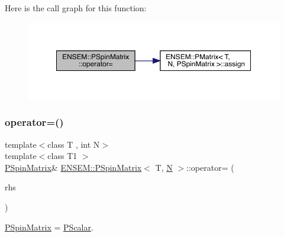 Here is the call graph for this function\+:
\nopagebreak
\begin{figure}[H]
\begin{center}
\leavevmode
\includegraphics[width=350pt]{d0/d1e/classENSEM_1_1PSpinMatrix_a2a776d9189f8d6fa8f9d9bc6758713c9_cgraph}
\end{center}
\end{figure}
\mbox{\label{classENSEM_1_1PSpinMatrix_a0b0ca395b4662cc2f1a18724aa8354e4}} 
\subsubsection{\texorpdfstring{operator=()}{operator=()}\hspace{0.1cm}{\footnotesize\ttfamily [4/9]}}
{\footnotesize\ttfamily template$<$class T , int N$>$ \\
template$<$class T1 $>$ \\
\mbox{\hyperlink{classENSEM_1_1PSpinMatrix}{P\+Spin\+Matrix}}\& \mbox{\hyperlink{classENSEM_1_1PSpinMatrix}{E\+N\+S\+E\+M\+::\+P\+Spin\+Matrix}}$<$ T, \mbox{\hyperlink{adat__devel_2lib_2hadron_2operator__name__util_8cc_a7722c8ecbb62d99aee7ce68b1752f337}{N}} $>$\+::operator= (\begin{DoxyParamCaption}\item[{const \mbox{\hyperlink{classENSEM_1_1PScalar}{P\+Scalar}}$<$ T1 $>$ \&}]{rhs }\end{DoxyParamCaption})\hspace{0.3cm}{\ttfamily [inline]}}



\mbox{\hyperlink{classENSEM_1_1PSpinMatrix}{P\+Spin\+Matrix}} = \mbox{\hyperlink{classENSEM_1_1PScalar}{P\+Scalar}}. 

